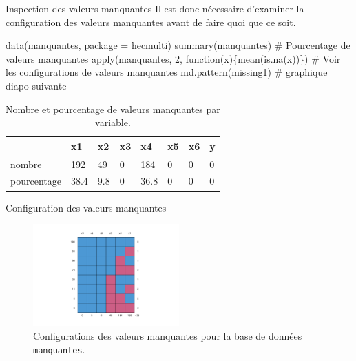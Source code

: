 \documentclass[
  ignorenonframetext,
]{beamer}
\newenvironment{Shaded}{\begin{snugshade}}{\end{snugshade}}
\newcommand{\AttributeTok}[1]{\textcolor[rgb]{0.40,0.45,0.13}{#1}}
\newcommand{\CommentTok}[1]{\textcolor[rgb]{0.37,0.37,0.37}{#1}}
\newcommand{\ControlFlowTok}[1]{\textcolor[rgb]{0.00,0.23,0.31}{#1}}
\newcommand{\DecValTok}[1]{\textcolor[rgb]{0.68,0.00,0.00}{#1}}
\newcommand{\FunctionTok}[1]{\textcolor[rgb]{0.28,0.35,0.67}{#1}}
\newcommand{\NormalTok}[1]{\textcolor[rgb]{0.00,0.23,0.31}{#1}}
\newcommand{\StringTok}[1]{\textcolor[rgb]{0.13,0.47,0.30}{#1}}
\begin{document}
\begin{frame}[fragile]{Inspection des valeurs manquantes}
\protect\hypertarget{inspection-des-valeurs-manquantes}{}
Il est donc nécessaire d'examiner la configuration des valeurs
manquantes avant de faire quoi que ce soit.

\begin{Shaded}
\begin{Highlighting}[numbers=left,,]
\FunctionTok{data}\NormalTok{(manquantes, }\AttributeTok{package =} \StringTok{\textquotesingle{}hecmulti\textquotesingle{}}\NormalTok{)}
\FunctionTok{summary}\NormalTok{(manquantes)}
\CommentTok{\# Pourcentage de valeurs manquantes}
\FunctionTok{apply}\NormalTok{(manquantes, }\DecValTok{2}\NormalTok{, }\ControlFlowTok{function}\NormalTok{(x)\{}\FunctionTok{mean}\NormalTok{(}\FunctionTok{is.na}\NormalTok{(x))\})}
\CommentTok{\# Voir les configurations de valeurs manquantes}
\FunctionTok{md.pattern}\NormalTok{(missing1) }\CommentTok{\# graphique diapo suivante}
\end{Highlighting}
\end{Shaded}

\hypertarget{tbl-manquantes-univ}{}
\begin{table}
\caption{\label{tbl-manquantes-univ}Nombre et pourcentage de valeurs manquantes par variable. }\tabularnewline

\centering
\begin{tabular}{llllllll}
\toprule
  & x1 & x2 & x3 & x4 & x5 & x6 & y\\
\midrule
nombre & 192 & 49 & 0 & 184 & 0 & 0 & 0\\
pourcentage & 38.4 & 9.8 & 0 & 36.8 & 0 & 0 & 0\\
\bottomrule
\end{tabular}
\end{table}
\end{frame}

\begin{frame}[fragile]{Configuration des valeurs manquantes}
\protect\hypertarget{configuration-des-valeurs-manquantes}{}
\begin{figure}

{\centering \includegraphics[width=0.5\textwidth,height=\textheight]{MATH60602-diapos13_files/figure-beamer/fig-manquantes2-1.pdf}

}

\caption{\label{fig-manquantes2}Configurations des valeurs manquantes
pour la base de données \texttt{manquantes}.}

\end{figure}
\end{frame}
\end{document}
